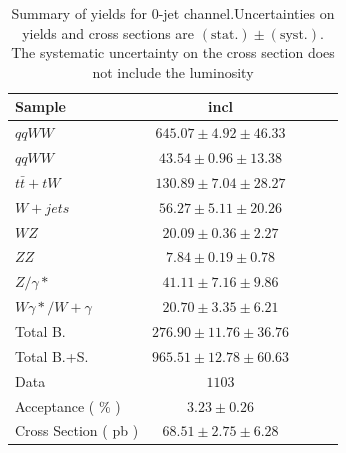 \begin{table}[!ht]
{\small
\begin{center}
\begin{tabular}{|l|c|c|c|c|}
\hline
Sample  & incl  \\ \hline
$qqWW$  & $645.07 \pm 4.92 \pm 46.33 $  \\
$qqWW$  & $43.54 \pm 0.96 \pm 13.38 $   \\
$t\bar{t} + tW$ & $130.89 \pm 7.04 \pm 28.27 $  \\
$W+jets$    & $56.27 \pm 5.11 \pm 20.26 $   \\
$WZ$    & $20.09 \pm 0.36 \pm 2.27 $    \\
$ZZ$    & $7.84 \pm 0.19 \pm 0.78 $ \\
$Z/\gamma*$ & $41.11 \pm 7.16 \pm 9.86 $    \\
$W\gamma*/W+\gamma$ & $20.70 \pm 3.35 \pm 6.21 $    \\
\hline \hline
Total B.    & $276.90 \pm 11.76 \pm 36.76 $ \\ \hline \hline
Total B.+S. & $965.51 \pm 12.78 \pm 60.63 $ \\ \hline \hline
Data    & $1103$    \\ \hline \hline
Acceptance ( \% )   & $3.23 \pm 0.26    $\\
Cross Section ( pb )    & $68.51 \pm 2.75 \pm 6.28$     \\ \hline
\end{tabular}
\caption{Summary of yields for 0-jet channel.Uncertainties on yields and cross sections are $\mathrm{(stat.)} \pm \mathrm{(syst.)}$. The systematic uncertainty on the cross section does not include the luminosity}
\label{tab:datayields_wwxsec_0j_incl}
\end{center}}
\end{table}


